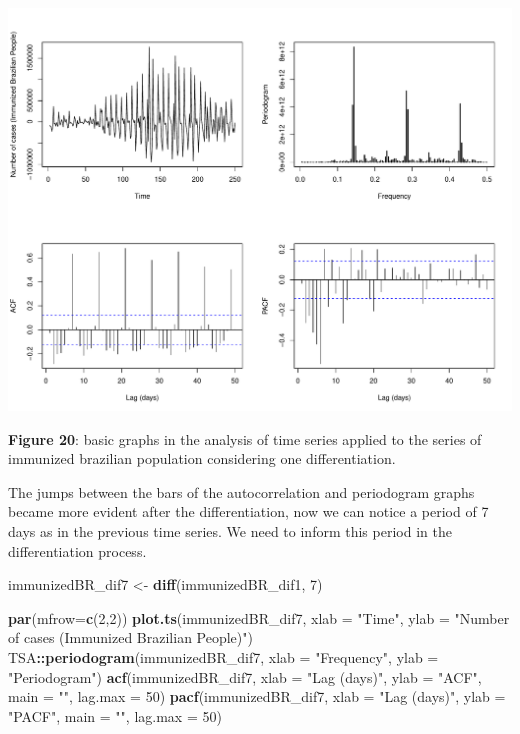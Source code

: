 \documentclass[
]{article}
\newenvironment{Shaded}{\begin{snugshade}}{\end{snugshade}}
\newcommand{\AttributeTok}[1]{\textcolor[rgb]{0.13,0.29,0.53}{#1}}
\newcommand{\DecValTok}[1]{\textcolor[rgb]{0.00,0.00,0.81}{#1}}
\newcommand{\FunctionTok}[1]{\textcolor[rgb]{0.13,0.29,0.53}{\textbf{#1}}}
\newcommand{\NormalTok}[1]{#1}
\newcommand{\OtherTok}[1]{\textcolor[rgb]{0.56,0.35,0.01}{#1}}
\newcommand{\SpecialCharTok}[1]{\textcolor[rgb]{0.81,0.36,0.00}{\textbf{#1}}}
\newcommand{\StringTok}[1]{\textcolor[rgb]{0.31,0.60,0.02}{#1}}
\renewenvironment{Shaded}{\begin{mdframed}[ backgroundcolor=shadecolor, linecolor = shadecolor, leftmargin=\dimexpr\leftmargin-2pt\relax, innerleftmargin=1.6pt, innertopmargin=5pt, skipabove=10pt,skipbelow=3pt ]}{\end{mdframed}}
\begin{document}
\begin{center}\includegraphics[width=\linewidth]{IF_results_ENG_files/figure-latex/unnamed-chunk-25-1} \end{center}

\textbf{Figure 20}: basic graphs in the analysis of time series applied
to the series of immunized brazilian population considering one
differentiation.

The jumps between the bars of the autocorrelation and periodogram graphs
became more evident after the differentiation, now we can notice a
period of 7 days as in the previous time series. We need to inform this
period in the differentiation process.

\begin{Shaded}
\begin{Highlighting}[]
\NormalTok{immunizedBR\_dif7 }\OtherTok{\textless{}{-}} \FunctionTok{diff}\NormalTok{(immunizedBR\_dif1, }\DecValTok{7}\NormalTok{)}

\FunctionTok{par}\NormalTok{(}\AttributeTok{mfrow=}\FunctionTok{c}\NormalTok{(}\DecValTok{2}\NormalTok{,}\DecValTok{2}\NormalTok{))}
\FunctionTok{plot.ts}\NormalTok{(immunizedBR\_dif7,}
        \AttributeTok{xlab =} \StringTok{"Time"}\NormalTok{,}
        \AttributeTok{ylab =} \StringTok{"Number of cases (Immunized Brazilian People)"}\NormalTok{)}
\NormalTok{TSA}\SpecialCharTok{::}\FunctionTok{periodogram}\NormalTok{(immunizedBR\_dif7,}
                 \AttributeTok{xlab =} \StringTok{"Frequency"}\NormalTok{,}
                 \AttributeTok{ylab =} \StringTok{"Periodogram"}\NormalTok{)}
\FunctionTok{acf}\NormalTok{(immunizedBR\_dif7,}
    \AttributeTok{xlab =} \StringTok{"Lag (days)"}\NormalTok{,}
    \AttributeTok{ylab =} \StringTok{"ACF"}\NormalTok{,}
    \AttributeTok{main =} \StringTok{""}\NormalTok{,}
    \AttributeTok{lag.max =} \DecValTok{50}\NormalTok{)}
\FunctionTok{pacf}\NormalTok{(immunizedBR\_dif7,}
     \AttributeTok{xlab =} \StringTok{"Lag (days)"}\NormalTok{,}
     \AttributeTok{ylab =} \StringTok{"PACF"}\NormalTok{,}
     \AttributeTok{main =} \StringTok{""}\NormalTok{,}
     \AttributeTok{lag.max =} \DecValTok{50}\NormalTok{)}
\end{Highlighting}
\end{Shaded}
\end{document}
